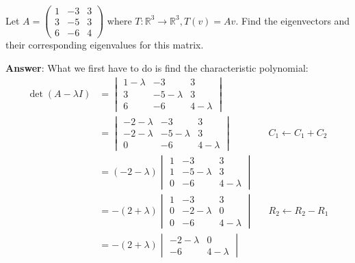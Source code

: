 \begin{exm}\label{exm-algebraic-geometrix-multiplicity}
	Let $A=
		\left(
		\begin{smallmatrix}
				1 & -3 & 3 \\
				3 & -5 & 3 \\
				6 & -6 & 4
			\end{smallmatrix}
		\right)$ where $T:\mathbb{R}^3\to\mathbb{R}^3,T(v)=Av$. Find the eigenvectors and
	their corresponding eigenvalues for this matrix.
	\begin{flushleft}
		\textbf{Answer}: What we first have to do is find the characteristic polynomial:
		\begin{align*}
			\det(A - \lambda I) & = \begin{vmatrix}
				1-\lambda & -3         & 3         \\
				3         & -5-\lambda & 3         \\
				6         & -6         & 4-\lambda
			\end{vmatrix}                                                  \\
			                    & = \begin{vmatrix}
				-2-\lambda & -3         & 3         \\
				-2-\lambda & -5-\lambda & 3         \\
				0          & -6         & 4-\lambda
			\end{vmatrix}              &  & \text{$C_1\leftarrow C_1+C_2$} \\
			                    & = (-2-\lambda) \begin{vmatrix}
				1 & -3         & 3         \\
				1 & -5-\lambda & 3         \\
				0 & -6         & 4-\lambda
			\end{vmatrix}                                     \\
			                    & = -(2+\lambda) \begin{vmatrix}
				1 & -3         & 3         \\
				0 & -2-\lambda & 0         \\
				0 & -6         & 4-\lambda
			\end{vmatrix} &  & \text{$R_2\leftarrow R_2-R_1$} \\
			                    & = -(2+\lambda) \begin{vmatrix}
				-2-\lambda & 0         \\
				-6         & 4-\lambda
			\end{vmatrix}                                     \\

\end{align*}
\end{flushleft}
\end{exm}
